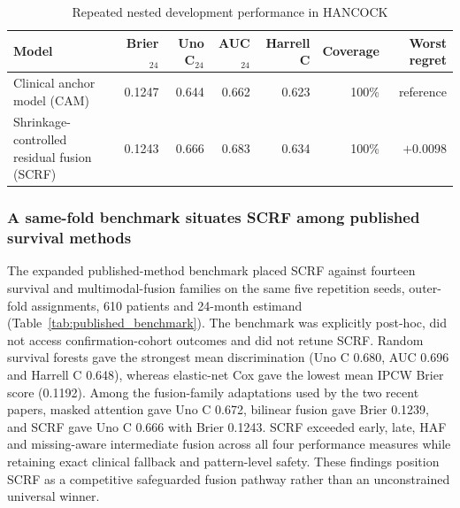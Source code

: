 \documentclass[pdflatex,sn-nature]{sn-jnl}
\begin{document}
\begin{table}[t]
\centering
\caption{Repeated nested development performance in HANCOCK}\label{tab:development}
\small\setlength{\tabcolsep}{2.5pt}
\begin{tabularx}{\textwidth}{>{\raggedright\arraybackslash}Xrrrrrr}
\toprule
Model & Brier$_{24}$ & Uno C$_{24}$ & AUC$_{24}$ & Harrell C & Coverage & Worst regret\\
\midrule
Clinical anchor model (CAM) & 0.1247 & 0.644 & 0.662 & 0.623 & 100\% & reference\\
Shrinkage-controlled residual fusion (SCRF) & 0.1243 & 0.666 & 0.683 & 0.634 & 100\% & $+0.0098$\\
\bottomrule
\end{tabularx}
\end{table}

\subsubsection*{A same-fold benchmark situates SCRF among published survival methods}

The expanded published-method benchmark placed SCRF against fourteen survival and multimodal-fusion families on the same five repetition seeds, outer-fold assignments, 610 patients and 24-month estimand (Table~\ref{tab:published_benchmark}). The benchmark was explicitly post-hoc, did not access confirmation-cohort outcomes and did not retune SCRF. Random survival forests gave the strongest mean discrimination (Uno C 0.680, AUC 0.696 and Harrell C 0.648), whereas elastic-net Cox gave the lowest mean IPCW Brier score (0.1192). Among the fusion-family adaptations used by the two recent papers, masked attention gave Uno C 0.672, bilinear fusion gave Brier 0.1239, and SCRF gave Uno C 0.666 with Brier 0.1243. SCRF exceeded early, late, HAF and missing-aware intermediate fusion across all four performance measures while retaining exact clinical fallback and pattern-level safety. These findings position SCRF as a competitive safeguarded fusion pathway rather than an unconstrained universal winner.
\end{document}

